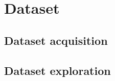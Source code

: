 \chapter{Dataset}



\section{Dataset acquisition}

\section{Dataset exploration}
\label{chap:dataset-exploration}
